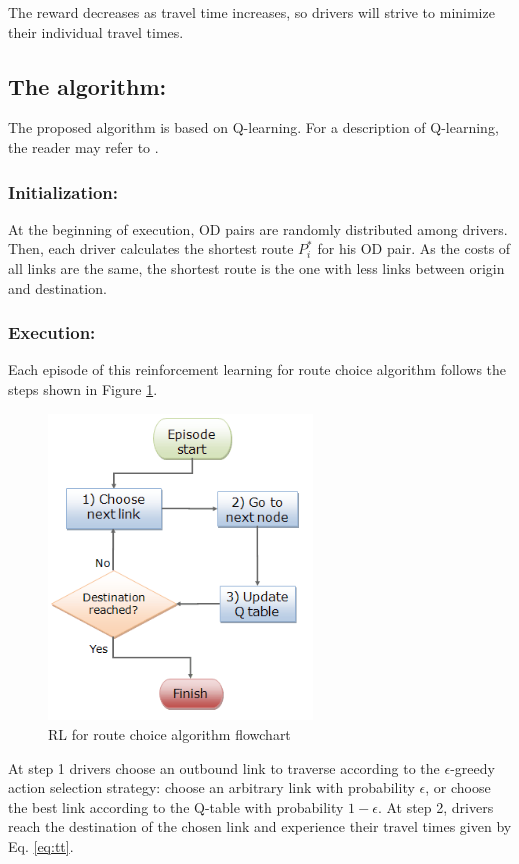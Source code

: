 \documentclass[12pt]{llncs}
\begin{document}
The reward decreases as travel time increases, so drivers will strive to minimize their individual travel times.

\subsection{The algorithm:}

The proposed algorithm is based on Q-learning. For a description of Q-learning, the reader may refer to \cite{Watkins&Dayan1992}. 

\subsubsection{Initialization:}
At the beginning of execution, OD pairs are randomly distributed among drivers. Then, each driver calculates the shortest route $P_i^*$ for his OD pair. As the costs of all links are the same, the shortest route is the one with less links between origin and destination. 

\subsubsection{Execution:}

Each episode of this reinforcement learning for route choice algorithm follows the steps shown in Figure \ref{fig:flowchart}.

\begin{figure}[ht]
    \centerline{\includegraphics[width=7cm]{img/flowchart2.png}}
    \caption{RL for route choice algorithm flowchart}
    \label{fig:flowchart}
\end{figure}

At step 1 drivers choose an outbound link to traverse according to the $\epsilon$-greedy action selection strategy: choose an arbitrary link with probability $\epsilon$, or choose the best link according to the Q-table with probability $1-\epsilon$. At step 2, drivers reach the destination of the chosen link and experience their travel times given by Eq. \eqref{eq:tt}.
\end{document}

